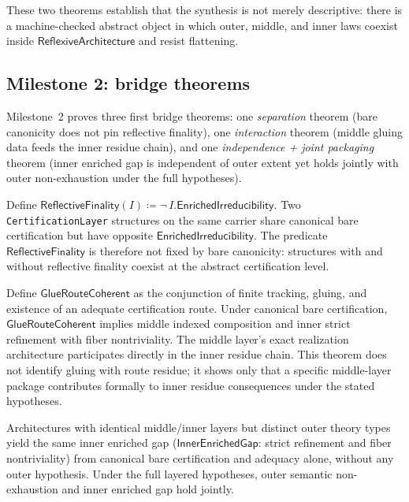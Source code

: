 \documentclass[11pt]{article}
\newcommand{\RAL}{\ensuremath{\mathsf{ReflexiveArchitecture}}}
\newcommand{\EnrIrr}{\ensuremath{\mathsf{EnrichedIrreducibility}}}
\newcommand{\RefFin}{\ensuremath{\mathsf{ReflectiveFinality}}}
\newcommand{\GRC}{\ensuremath{\mathsf{GlueRouteCoherent}}}
\newcommand{\IEG}{\ensuremath{\mathsf{InnerEnrichedGap}}}
\begin{document}
These two theorems establish that the synthesis is not merely descriptive: there is a
machine-checked abstract object in which outer, middle, and inner laws coexist inside
$\RAL$ and resist flattening.

\subsection{Milestone 2: bridge theorems}

Milestone~2 proves three first bridge theorems: one \emph{separation} theorem (bare
canonicity does not pin reflective finality), one \emph{interaction} theorem (middle
gluing data feeds the inner residue chain), and one \emph{independence + joint packaging}
theorem (inner enriched gap is independent of outer extent yet holds jointly with outer
non-exhaustion under the full hypotheses).

\begin{theorem}
\label{thm:bcrf}
Define $\RefFin(I) \coloneqq \neg\, I.\EnrIrr$.  Two \texttt{CertificationLayer}
structures on the same carrier share canonical bare certification but have opposite
$\EnrIrr$.  The predicate $\RefFin$ is therefore not fixed by bare canonicity:
structures with and without reflective finality coexist at the abstract certification level.
\par{}
\end{theorem}

\begin{theorem}
\label{thm:grc}
Define $\GRC$ as the conjunction of finite tracking, gluing, and existence of an adequate
certification route.  Under canonical bare certification, $\GRC$ implies middle indexed
composition and inner strict refinement with fiber nontriviality.  The middle layer's
exact realization architecture participates directly in the inner residue chain.
This theorem does not identify gluing with route residue; it shows only that a specific
middle-layer package contributes formally to inner residue consequences under the
stated hypotheses.
\par{}
\end{theorem}

\begin{theorem}
\label{thm:ieg}\sloppy
Architectures with identical middle/inner layers but distinct outer theory types yield
the same inner enriched gap ($\IEG$: strict refinement and fiber nontriviality) from
canonical bare certification and adequacy alone, without any outer hypothesis.  Under
the full layered hypotheses, outer semantic non-exhaustion and inner enriched gap hold
jointly.
\par{}
\end{theorem}
\end{document}
